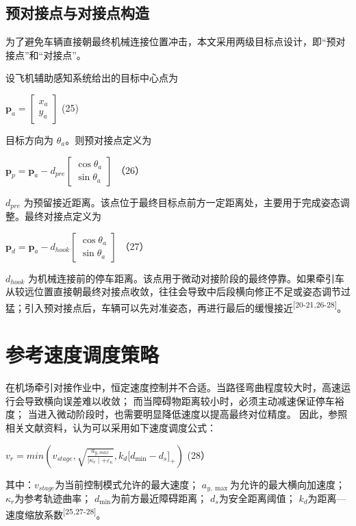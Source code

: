\subsection{预对接点与对接点构造}

为了避免车辆直接朝最终机械连接位置冲击，本文采用两级目标点设计，即“预对接点”和“对接点”。

设飞机辅助感知系统给出的目标中心点为

\(\mathbf{p}_{a} = \left\lbrack \begin{array}{r}
x_{a} \\
y_{a}
\end{array} \right\rbrack\) (25)

目标方向为 \(\theta_{a}\)。则预对接点定义为

\(\mathbf{p}_{p} = \mathbf{p}_{a} - d_{pre}\left\lbrack \begin{array}{r}
\cos\theta_{a} \\
\sin\theta_{a}
\end{array} \right\rbrack\) （26）

\(d_{pre}\)
为预留接近距离。该点位于最终目标点前方一定距离处，主要用于完成姿态调整。最终对接点定义为

\(\mathbf{p}_{d} = \mathbf{p}_{a} - d_{hook}\left\lbrack \begin{array}{r}
\cos\theta_{a} \\
\sin\theta_{a}
\end{array} \right\rbrack\) （27）

\(d_{hook}\)
为机械连接前的停车距离。该点用于微动对接阶段的最终停靠。如果牵引车从较远位置直接朝最终对接点收敛，往往会导致中后段横向修正不足或姿态调节过猛；引入预对接点后，车辆可以先对准姿态，再进行最后的缓慢接近\textsuperscript{[20-21,26-28]}。

\section{参考速度调度策略}

在机场牵引对接作业中，恒定速度控制并不合适。当路径弯曲程度较大时，高速运行会导致横向误差难以收敛；
而当障碍物距离较小时，必须主动减速保证停车裕度；
当进入微动阶段时，也需要明显降低速度以提高最终对位精度。
因此，参照相关文献资料，认为可以采用如下速度调度公式：

\(v_{r} = min\left( v_{stage},\sqrt{\frac{a_{y,max}}{\mid \kappa_{r} \mid + \varepsilon_{\kappa}}},k_{d}\lbrack d_{\min} - d_{s}\rbrack_{+} \right)\)
(28）

其中：\(v_{stage}\)为当前控制模式允许的最大速度；
\(a_{y,\max}\)为允许的最大横向加速度； \(\kappa_{r}\)为参考轨迹曲率；
\(d_{\min}\)为前方最近障碍距离； \(d_{s}\)为安全距离阈值；
\(k_{d}\)为距离---速度缩放系数\textsuperscript{[25,27-28]}。

